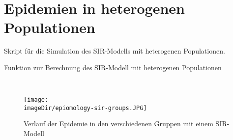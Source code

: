 \section{Epidemien in heterogenen Populationen}
\label{sec:epidemiology-heterogen}

\begin{code}
	\caption{Skript für die Simulation des SIR-Modells mit heterogenen Populationen.}
	\label{source:epidemiology-sir-groups-program}
\end{code}

\begin{code}
	\caption{Funktion zur Berechnung des SIR-Modell mit heterogenen Populationen}
	\label{source:epidemiology-sir-groups}
\end{code}
\ \newpage


\begin{figure}[h]
	\centering
	\texttt{[image: \\imageDir/epiomology-sir-groups.JPG]}
	\caption{Verlauf der Epidemie in den verschiedenen Gruppen mit einem SIR-Modell}
	\label{test:epidemiology-sir}
\end{figure}

